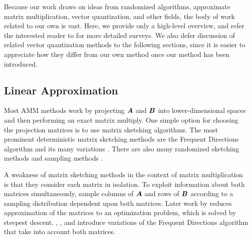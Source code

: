 
Because our work draws on ideas from randomized algorithms, approximate matrix multiplication, vector quantization, and other fields, the body of work related to our own is vast. Here, we provide only a high-level overview, and refer the interested reader to \cite{learningToHashSurvey, hashingSimilaritySurvey, isvd} for more detailed surveys. We also defer discussion of related vector quantization methods to the following sections, since it is easier to appreciate how they differ from our own method once our method has been introduced.

\vspace{-1mm}
\subsection{Linear Approximation}
Most AMM methods work by projecting $\bm{A}$ and $\bm{B}$ into lower-dimensional spaces and then performing an exact matrix multiply.
One simple option for choosing the projection matrices is to use matrix sketching algorithms. The most prominent deterministic matrix sketching methods are the Frequent Directions algorithm \cite{liberty_simple_2012, ghashami_frequent_2016} and its many variations \cite{teng_fast_2019, francis_practical_2018, ye_frequent_2016, huang_near_2019, luo_robust_2019, francis_improvement_2018}. There are also many randomized sketching methods \cite{sarlos_improved_2006, kyrillidis_approximate_2014, pagh_compressed_2013, hashjl,osnap} and sampling methods \cite{drineas_fast_2006-1, drineas_fast_2006-2}.

A weakness of matrix sketching methods in the context of matrix multiplication is that they consider each matrix in isolation. To exploit information about both matrices simultaneously, \citet{drineas_fast_2006} sample columns of $\bm{A}$ and rows of $\bm{B}$ according to a sampling distribution dependent upon both matrices. Later work by \citet{manne_fast_2014} reduces approximation of the matrices to an optimization problem, which is solved by steepest descent. \citet{mroueh_co-occuring_2016}, \citet{ye_frequent_2016}, and \citet{francis_improvement_2018} introduce variations of the Frequent Directions algorithm that take into account both matrices.

